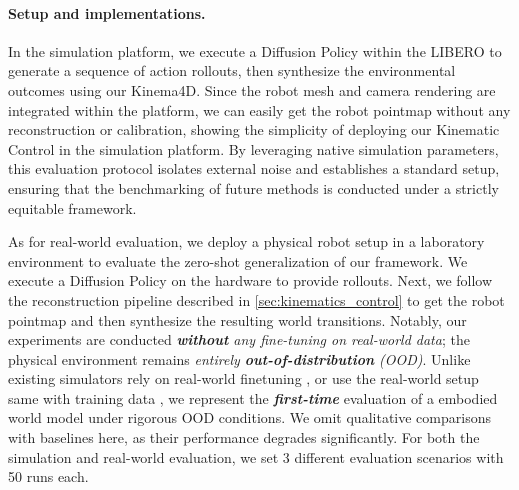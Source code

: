 \paragraph{Setup and implementations.}
In the simulation platform, we execute a Diffusion Policy \cite{chi2025diffusion} within the LIBERO \cite{libero} to generate a sequence of action rollouts, then synthesize the environmental outcomes using our Kinema4D. Since the robot mesh and camera rendering are integrated within the platform, we can easily get the robot pointmap without any reconstruction or calibration, showing the simplicity of deploying our Kinematic Control in the simulation platform.
By leveraging native simulation parameters, this evaluation protocol isolates external noise and establishes a standard setup, ensuring that the benchmarking of future methods is conducted under a strictly equitable framework.

As for real-world evaluation, we deploy a physical robot setup in a laboratory environment to evaluate the zero-shot generalization of our framework. We execute a Diffusion Policy \cite{chi2025diffusion} on the hardware to provide rollouts. Next, we follow the reconstruction pipeline described in \cref{sec:kinematics_control} to get the robot pointmap and then synthesize the resulting world transitions. Notably, our experiments are conducted \textit{\textbf{without} any fine-tuning on real-world data}; the physical environment remains \textit{entirely \textbf{out-of-distribution} (OOD)}. Unlike existing simulators rely on real-world finetuning \cite{zhu2025irasim}, or use the real-world setup same with training data \cite{guo2026ctrl}, we represent the \textbf{\textit{first-time}} evaluation of a embodied world model under rigorous OOD conditions. We omit qualitative comparisons with baselines here, as their performance degrades significantly.
For both the simulation and real-world evaluation, we set 3 different evaluation scenarios with 50 runs each.

